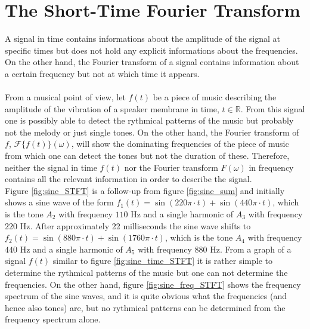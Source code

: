 \section{The Short-Time Fourier Transform}
A signal in time contains informations about the amplitude of the signal at specific times but does not hold any explicit informations about the frequencies. On the other hand, the Fourier transform of a signal contains information about a certain frequency but not at which time it appears.
\\ \\
From a musical point of view, let $f(t)$ be a piece of music describing the amplitude of the vibration of a speaker membrane in time, $t \in \mathbb{R}$. From this signal one is possibly able to detect the rythmical patterns of the music but probably not the melody or just single tones. On the other hand, the Fourier transform of $f$, $\mathcal{F}\{f(t)\}(\omega)$, will show the dominating frequencies of the piece of music from which one can detect the tones but not the duration of these. Therefore, neither the signal in time $f(t)$ nor the Fourier transform $F(\omega)$ in frequency contains all the relevant information in order to describe the signal.
\\
Figure \ref{fig:sine_STFT} is a follow-up from figure \ref{fig:sine_sum} and initially shows a sine wave of the form $f_1(t) = \sin(220\pi\cdot t) + \sin(440\pi\cdot t)$, which is the tone $A_2$ with frequency $110$ Hz and a single harmonic of $A_3$ with frequency $220$ Hz. After approximately 22 milliseconds the sine wave shifts to $f_2(t) = \sin(880\pi\cdot t) + \sin(1760\pi\cdot t)$, which is the tone $A_4$ with frequency $440$ Hz and a single harmonic of $A_5$ with frequency $880$ Hz. From a graph of a signal $f(t)$ similar to figure \ref{fig:sine_time_STFT} it is rather simple to determine the rythmical patterns of the music but one can not determine the frequencies. On the other hand, figure \ref{fig:sine_freq_STFT} shows the frequency spectrum of the sine waves, and it is quite obvious what the frequencies (and hence also tones) are, but no rythmical patterns can be determined from the frequency spectrum alone.

